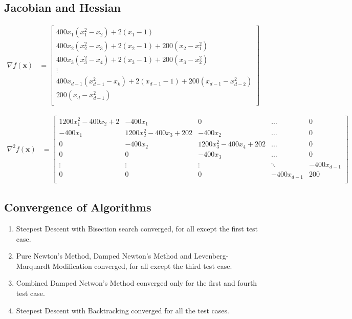 \documentclass[a4paper]{article}
\begin{document}
\subsection{Jacobian and Hessian}

\begin{align*}
\nabla f(\textbf{x}) &=
    \begin{bmatrix}
        400 x_1 (x_1^2 - x_2) + 2 (x_1 - 1) \\
        400 x_2 (x_2^2 - x_3) + 2 (x_2 - 1) + 200 (x_2 - x_1^2) \\
        400 x_3 (x_3^2 - x_4) + 2 (x_3 - 1) + 200 (x_3 - x_2^2) \\
        \vdots \\
        400 x_{d-1} (x_{d-1}^2 - x_k) + 2 (x_{d-1} - 1) + 200 (x_{d-1} - x_{d-2}^2) \\
        200 (x_d - x_{d-1}^2) \\
    \end{bmatrix}
\end{align*}

\begin{align*}
\nabla^2 f(\textbf{x}) &=
    \begin{bmatrix}
        1200 x_1^2 - 400 x_2 + 2 & -400 x_1 & 0 & \dots & 0 \\
        -400 x_1 & 1200 x_2^2 - 400 x_3 + 202 & -400 x_2 & \dots & 0 \\
        0 & -400 x_2 & 1200 x_3^2 - 400 x_4 + 202 & \dots & 0 \\
        0 & 0 & -400 x_3 & \dots & 0 \\
        \vdots & \vdots & \vdots & \ddots & -400 x_{d-1} \\
        0 & 0 & 0 & -400 x_{d-1} & 200 \\
    \end{bmatrix}
\end{align*}

\subsection{Convergence of Algorithms}

\begin{enumerate}

\item Steepest Descent with Bisection search converged, for all except the first test case.

\item Pure Newton's Method, Damped Newton's Method and Levenberg-Marquardt Modification converged, for all except the third test case.

\item Combined Damped Netwon's Method converged only for the first and fourth test case.

\item Steepest Descent with Backtracking converged for all the test cases.

\end{enumerate}
\end{document}

